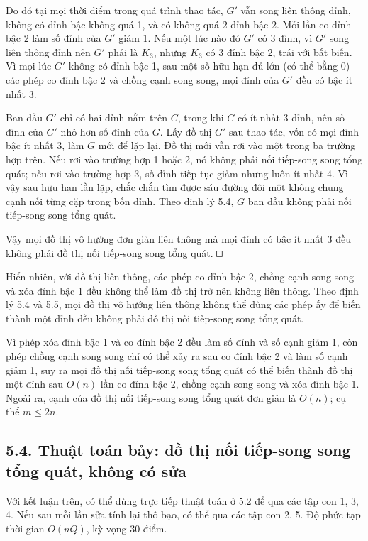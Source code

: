 \documentclass[11pt]{article}
\newcommand{\square}{\mathord{\vcenter{\hrule height .5pt
  \hbox{\vrule width .5pt height 5pt\kern5pt\vrule width .5pt}
  \hrule height .5pt}}}
\begin{document}
Do đó tại mọi thời điểm trong quá trình thao tác, \(G'\) vẫn song liên thông
đỉnh, không có đỉnh bậc không quá 1, và có không quá 2 đỉnh bậc 2. Mỗi lần co
đỉnh bậc 2 làm số đỉnh của \(G'\) giảm 1. Nếu một lúc nào đó \(G'\) có 3
đỉnh, vì \(G'\) song liên thông đỉnh nên \(G'\) phải là \(K_3\), nhưng \(K_3\)
có 3 đỉnh bậc 2, trái với bất biến. Vì mọi lúc \(G'\) không có đỉnh bậc 1,
sau một số hữu hạn đủ lớn (có thể bằng 0) các phép co đỉnh bậc 2 và chồng
cạnh song song, mọi đỉnh của \(G'\) đều có bậc ít nhất 3.

Ban đầu \(G'\) chỉ có hai đỉnh nằm trên \(C\), trong khi \(C\) có ít nhất 3
đỉnh, nên số đỉnh của \(G'\) nhỏ hơn số đỉnh của \(G\). Lấy đồ thị \(G'\) sau
thao tác, vốn có mọi đỉnh bậc ít nhất 3, làm \(G\) mới để lặp lại. Đồ thị mới
vẫn rơi vào một trong ba trường hợp trên. Nếu rơi vào trường hợp 1 hoặc 2, nó
không phải nối tiếp-song song tổng quát; nếu rơi vào trường hợp 3, số đỉnh
tiếp tục giảm nhưng luôn ít nhất 4. Vì vậy sau hữu hạn lần lặp, chắc chắn tìm
được sáu đường đôi một không chung cạnh nối từng cặp trong bốn đỉnh. Theo
định lý 5.4, \(G\) ban đầu không phải nối tiếp-song song tổng quát.

Vậy mọi đồ thị vô hướng đơn giản liên thông mà mọi đỉnh có bậc ít nhất 3 đều
không phải đồ thị nối tiếp-song song tổng quát. \(\square\)

Hiển nhiên, với đồ thị liên thông, các phép co đỉnh bậc 2, chồng cạnh song
song và xóa đỉnh bậc 1 đều không thể làm đồ thị trở nên không liên thông.
Theo định lý 5.4 và 5.5, mọi đồ thị vô hướng liên thông không thể dùng các
phép ấy để biến thành một đỉnh đều không phải đồ thị nối tiếp-song song tổng
quát.

Vì phép xóa đỉnh bậc 1 và co đỉnh bậc 2 đều làm số đỉnh và số cạnh giảm 1,
còn phép chồng cạnh song song chỉ có thể xảy ra sau co đỉnh bậc 2 và làm số
cạnh giảm 1, suy ra mọi đồ thị nối tiếp-song song tổng quát có thể biến thành
đồ thị một đỉnh sau \(O(n)\) lần co đỉnh bậc 2, chồng cạnh song song và xóa
đỉnh bậc 1. Ngoài ra, cạnh của đồ thị nối tiếp-song song tổng quát đơn giản là
\(O(n)\); cụ thể \(m\le2n\).

\subsection*{5.4. Thuật toán bảy: đồ thị nối tiếp-song song tổng quát, không có sửa}

Với kết luận trên, có thể dùng trực tiếp thuật toán ở 5.2 để qua các tập con
1, 3, 4. Nếu sau mỗi lần sửa tính lại thô bạo, có thể qua các tập con 2, 5.
Độ phức tạp thời gian \(O(nQ)\), kỳ vọng 30 điểm.
\end{document}
